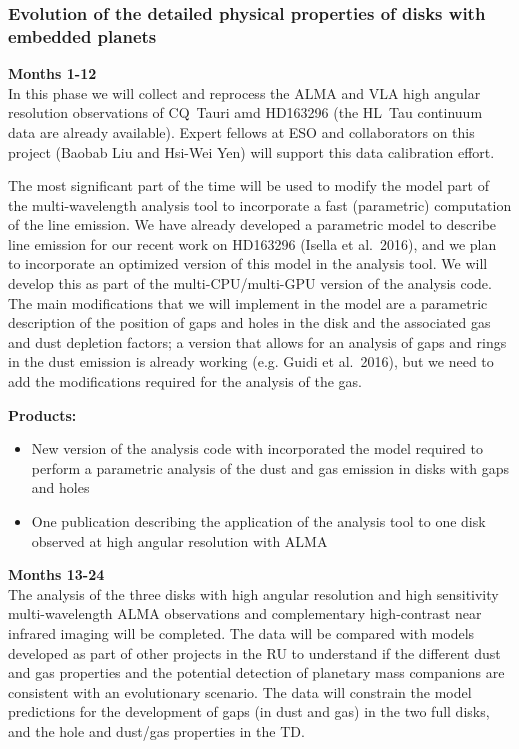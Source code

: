 \documentclass[10pt,fleqn,twoside]{article}
\begin{document}
\subsubsection{Evolution of the detailed physical properties of disks with embedded planets}

{\Tcol\bf Months 1-12}\\
In this phase we will collect and reprocess the ALMA and VLA high angular resolution observations of CQ~Tauri amd HD163296 (the HL~Tau continuum data are already available). Expert fellows at ESO and collaborators on this project (Baobab Liu and Hsi-Wei Yen) will support this data calibration effort.

The most significant part of the time will be used to modify the model part of the multi-wavelength analysis tool to incorporate a fast (parametric) computation of the line emission. We have already developed a parametric model to describe line emission for our recent work on HD163296 (Isella et al.~2016), and we plan to incorporate an optimized version of this model in the analysis tool. 
We will develop this as part of the multi-CPU/multi-GPU version of the analysis code.  The main modifications that we will implement in the model are a parametric description of the position of gaps and holes in the disk and the associated gas and dust depletion factors; a version that allows for an analysis of gaps and rings in the dust emission is already working (e.g. Guidi et al.~2016), but we need to add the modifications required for the analysis of the gas.

\smallskip
{\bf Products:} 
\begin{itemize}
\item New version of the analysis code with incorporated the model required to perform a parametric analysis of the dust and gas emission in disks with gaps and holes
\item One publication describing the application of the analysis tool to one disk observed at high angular resolution with ALMA
\end{itemize}

{\Tcol\bf Months 13-24}\\
The analysis of the three disks with high angular resolution and high sensitivity multi-wavelength ALMA observations and complementary high-contrast near infrared imaging will be completed. The data will be compared with models developed as part of other projects in the RU to understand if the different dust 
and gas properties and the potential detection of planetary mass companions are consistent with an evolutionary scenario. The data will constrain the model predictions for the development of gaps (in dust and gas) in the two full disks, and the hole and dust/gas properties in the TD.
\end{document}

